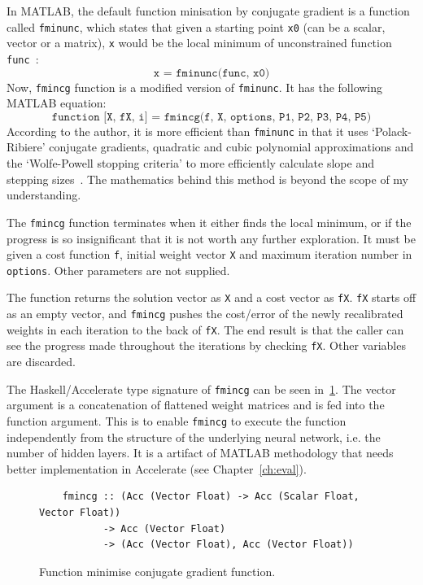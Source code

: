 In MATLAB, the default function minisation by conjugate gradient is a function called \texttt{fminunc}, which states that given a starting point \texttt{x0} (can be a scalar, vector or a matrix), \texttt{x} would be the local minimum of unconstrained function \texttt{func}~\cite{Mat17}:
$$\texttt{x = fminunc(func, x0)}$$
Now, \texttt{fmincg} function is a modified version of \texttt{fminunc}. It has the following MATLAB equation:
$$\texttt{function [X, fX, i] = fmincg(f, X, options, P1, P2, P3, P4, P5)}$$
According to the author, it is more efficient than \texttt{fminunc} in that it uses `Polack-Ribiere' conjugate gradients, quadratic and cubic polynomial approximations and the `Wolfe-Powell stopping criteria' to more efficiently calculate slope and stepping sizes~\cite{Reb13}. The mathematics behind this method is beyond the scope of my understanding.

The \texttt{fmincg} function terminates when it either finds the local minimum, or if the progress is so insignificant that it is not worth any further exploration. It must be given a cost function \texttt{f}, initial weight vector \texttt{X} and maximum iteration number in \texttt{options}. Other parameters are not supplied. 

The function returns the solution vector as \texttt{X} and a cost vector as \texttt{fX}. \texttt{fX} starts off as an empty vector, and \texttt{fmincg} pushes the cost/error of the newly recalibrated weights in each iteration to the back of \texttt{fX}. The end result is that the caller can see the progress made throughout the iterations by checking \texttt{fX}. Other variables are discarded.

The Haskell/Accelerate type signature of \texttt{fmincg} can be seen in~\ref{fig:fmincg}. The vector argument is a concatenation of flattened weight matrices and is fed into the function argument. This is to enable \texttt{fmincg} to execute the function independently from the structure of the underlying neural network, i.e. the number of hidden layers. It is a artifact of MATLAB methodology that needs better implementation in Accelerate (see Chapter~\ref{ch:eval}).

\begin{figure}
	\begin{lstlisting}
	fmincg :: (Acc (Vector Float) -> Acc (Scalar Float, Vector Float))
           -> Acc (Vector Float)
           -> (Acc (Vector Float), Acc (Vector Float))
	\end{lstlisting}
  	\caption{Function minimise conjugate gradient function.}
	\label{fig:fmincg}
\end{figure}

